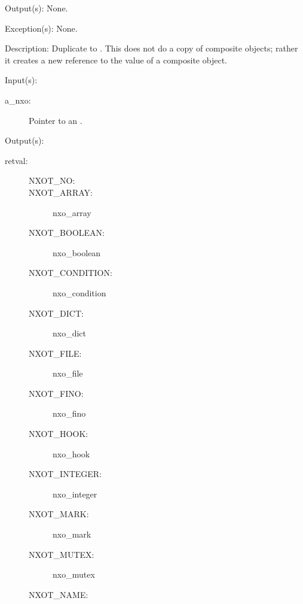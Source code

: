 \begin{capi}
\begin{capilist}
	\item[Output(s): ] None.
	\item[Exception(s): ] None.
	\item[Description: ]
		Duplicate  to .  This does not do a
		copy of composite objects; rather it creates a new reference to
		the value of a composite object.
	\end{capilist}
\label{nxo_type_get}
	\begin{capilist}
	\item[Input(s): ]
		\begin{description}\item[]
		\item[a\_nxo: ]
			Pointer to an .
		\end{description}
	\item[Output(s): ]
		\begin{description}\item[]
		\item[retval: ]
			\begin{description}\item[]
				\item[NXOT\_NO: ]
				\item[NXOT\_ARRAY: ]
					{nxo_array}
				\item[NXOT\_BOOLEAN: ]
					{nxo_boolean}
				\item[NXOT\_CONDITION: ]
					{nxo_condition}
				\item[NXOT\_DICT: ]
					{nxo_dict}
				\item[NXOT\_FILE: ]
					{nxo_file}
				\item[NXOT\_FINO: ]
					{nxo_fino}
				\item[NXOT\_HOOK: ]
					{nxo_hook}
				\item[NXOT\_INTEGER: ]
					{nxo_integer}
				\item[NXOT\_MARK: ]
					{nxo_mark}
				\item[NXOT\_MUTEX: ]
					{nxo_mutex}
				\item[NXOT\_NAME: ]

\end{description}
\end{description}
\end{capilist}
\end{capi}

